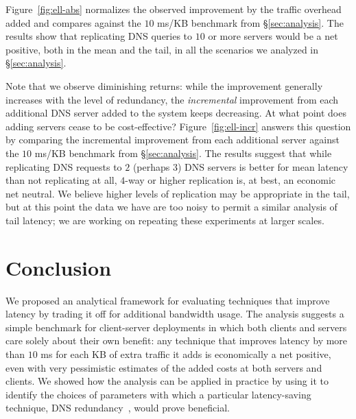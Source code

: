 \documentclass{sigcomm-alternate}
\begin{document}
Figure~\ref{fig:ell-abs} normalizes the observed improvement by the traffic overhead added and compares against the $10$ ms/KB benchmark from \S\ref{sec:analysis}.  The results show that replicating DNS queries to $10$ or more servers would be a net positive, both in the mean and the tail, in all the scenarios we analyzed in \S\ref{sec:analysis}.

Note that we observe diminishing returns: while the improvement generally increases with the level of redundancy, the \emph{incremental} improvement from each additional DNS server added to the system keeps decreasing.  At what point does adding servers cease to be cost-effective?  Figure~\ref{fig:ell-incr} answers this question by comparing the incremental improvement from each additional server against the $10$ ms/KB benchmark from \S\ref{sec:analysis}.  The results suggest that while replicating DNS requests to $2$ (perhaps $3$) DNS servers is better for mean latency than not replicating at all, $4$-way or higher replication is, at best, an economic net neutral.  We believe higher levels of replication may be appropriate in the tail, but at this point the data we have are too noisy to permit a similar analysis of tail latency; we are working on repeating these experiments at larger scales.

\section{Conclusion}

We proposed an analytical framework for evaluating techniques that improve latency by trading it off for additional bandwidth usage.  The analysis suggests a simple benchmark for client-server deployments in which both clients and servers care solely about their own benefit: any technique that improves latency by more than $10$ ms for each KB of extra traffic it adds is economically a net positive, even with very pessimistic estimates of the added costs at both servers and clients.  We showed how the analysis can be applied in practice by using it to identify the choices of parameters with which a particular latency-saving technique, DNS redundancy~\cite{Vulimiri2013,Vulimiri2012}, would prove beneficial.



\end{document}
